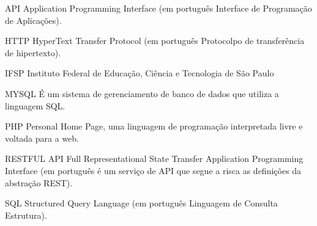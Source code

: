\begin{siglas}
  \item[API] Application Programming Interface (em português Interface de Programação de Aplicações).
  \item{HTTP} HyperText Transfer Protocol (em português Protocolpo de transferência de hipertexto).
  \item{IFSP} Instituto Federal de Educação, Ciência e Tecnologia de São Paulo
  \item{MYSQL} É um sistema de gerenciamento de banco de dados que utiliza a linguagem SQL.
  \item{PHP} Personal Home Page, uma linguagem de programação interpretada livre e voltada para a web.
  \item{RESTFUL API} Full Representational State Transfer Application Programming Interface (em português é um serviço de API que segue a risca as definições da abstração REST).
  \item{SQL} Structured Query Language (em português Linguagem de Consulta Estrutura).
\end{siglas}
